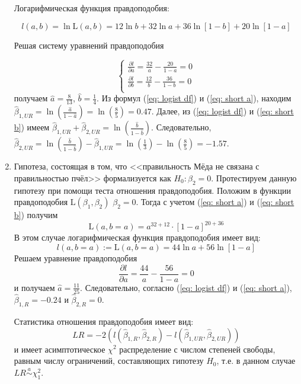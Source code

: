 \documentclass[pdftex,11pt,openany]{book}\usepackage[]{graphicx}\usepackage[]{color}
\begin{document}
\begin{solution}
\begin{enumerate}
Логарифмическая функция правдоподобия:

$$l(a, b) = \ln \text{L}(a, b) = 12\ln b + 32\ln a + 36\ln[1-b] + 20\ln[1 - a]$$

Решая систему уравнений правдоподобия

$$\begin{cases}
\frac{\partial l}{\partial a} = \frac{32}{a} - \frac{20}{1 - a} = 0 \\
\frac{\partial l}{\partial b} = \frac{12}{b} - \frac{36}{1 - b} = 0 \\
\end{cases}$$
получаем $\hat{a} = \frac{8}{13}$, $\hat{b} = \frac{1}{4}$. Из формул (\ref{eq: logist df}) и (\ref{eq: short a}), находим $\hat{\beta}_{1, UR} = \ln\left( \frac{\hat{a}}{1 - \hat{a}} \right)= \ln \left(\frac{8}{5} \right) = 0.47$. Далее, из (\ref{eq: logist df}) и (\ref{eq: short b}) имеем $\hat{\beta}_{1, UR} + \hat{\beta}_{2, UR} = \ln \left( \frac{\hat{b}}{1 - \hat{b}} \right)$. Следовательно, $\hat{\beta}_{2, UR} = \ln \left( \frac{\hat{b}}{1 - \hat{b}} \right) - \hat{\beta}_{1, UR} = \ln \left( \frac{1}{3} \right) - \ln \left( \frac{8}{5} \right) = -1.57$.

\item Гипотеза, состоящая в том, что <<правильность Мёда не связана с правильностью 
пчёл>> формализуется как $H_0: \beta_2 = 0$. Протестируем данную гипотезу при помощи теста 
отношения правдоподобия. Положим в функции правдоподобия $\text{L}(\beta_1, \beta_2)$ $\beta_2 = 0$. Тогда с учетом (\ref{eq: short a}) и (\ref{eq: short b}) получим
$$\text{L}(a, b=a) = a^{32+12} \cdot [1 - a]^{20+36}$$
В этом случае логарифмическая функция правдоподобия имеет вид:
$$l(a, b=a) := \text{L}(a, b=a) = 44 \ln a + 56 \ln[1 - a]$$
Решаем уравнение правдоподобия
$$\frac{\partial l}{\partial a} = \frac{44}{a} - \frac{56}{1 - a} = 0$$
и получаем $\hat{a} = \frac{11}{25}$. Следовательно, согласно (\ref{eq: logist df}) и (\ref{eq: short a}), $\hat{\beta}_{1, R} = -0.24$ и $\hat{\beta}_{2, R} = 0$.

Статистика отношения правдоподобия имеет вид:
$$LR = -2(l(\hat{\beta}_{1, R}, \hat{\beta}_{2, R}) - l(\hat{\beta}_{1, UR}, \hat{\beta}_{2, UR}))$$
и имеет асимптотическое $\chi^2$ распределение с числом степеней свободы, равным числу ограничений, составляющих гипотезу $H_0$, т.е. в данном случае $LR \overset{a}{\sim} \chi^2_1$.


\end{enumerate}
\end{solution}
\end{document}
